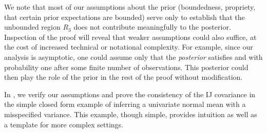 We note that most of our assumptions about the prior (boundedness, propriety,
that certain prior expectations are bounded) serve only to establish that the
unbounded region $R_3$ does not contribute meaningfully to the posterior.
Inspection of the proof will reveal that weaker assumptions could also suffice,
at the cost of increased technical or notational complexity. For example, since
our analysis is asymptotic, one could assume only that the \emph{posterior}
satisfies   and
  with probability one after some finite
number of observations.  This posterior could then play the role of the prior in
the rest of the proof without modification.

In , we verify our assumptions and prove the consistency
of the IJ covariance in the simple closed form example of inferring a univariate
normal mean with a misspecified variance.  This example, though simple, provides
intuition as well as a template for more complex settings.

